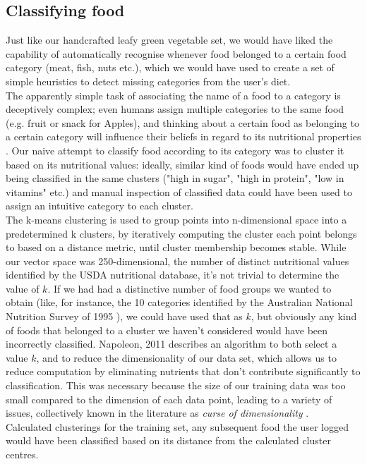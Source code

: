 \subsection{Classifying food}
Just like our handcrafted leafy green vegetable set, we would have liked the capability of automatically recognise whenever food belonged to a certain food category (meat, fish, nuts etc.), which we would have used to create a set of simple heuristics to detect missing categories from the user's diet. \\
The apparently simple task of associating the name of a food to a category is deceptively complex; even humans assign multiple categories to the same food (e.g. fruit or snack for Apples), and thinking about a certain food as belonging to a certain category will influence their beliefs in regard to its nutritional properties \cite{Hayes2011}.
Our naive attempt to classify food  according to its category was to cluster it based on its nutritional values: ideally, similar kind of foods would have ended up being classified in the same clusters ("high in sugar", "high in protein", "low in vitamins" etc.) and manual inspection of classified data could have been used to assign an intuitive category to each cluster. \\
The k-means clustering is used to group points into n-dimensional space into a predetermined k clusters, by iteratively computing the cluster each point belongs to based on a distance metric, until cluster membership becomes stable. While our vector space was 250-dimensional, the number of distinct nutritional values identified by the USDA nutritional database, it's not trivial to determine the value of $k$. If we had had a distinctive number of food groups we wanted to obtain (like, for instance, the 10 categories identified by the Australian National Nutrition Survey of 1995 \cite{NNS1995}), we could have used that as $k$, but obviously any kind of foods that belonged to a cluster we haven't considered would have been incorrectly classified. Napoleon, 2011 \cite{napoleon} describes an algorithm to both select a value $k$, and to reduce the dimensionality of our data set, which allows us to reduce computation by eliminating nutrients that don't contribute significantly to classification. This was necessary because the size of our training data was too small compared to the dimension of each data point, leading to a variety of issues, collectively known in the literature as \textit{curse of dimensionality} \cite{kriegel2009}.\\
Calculated clusterings for the training set, any subsequent food the user logged would have been classified based on its distance from the calculated cluster centres.
